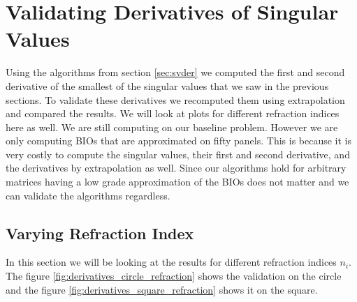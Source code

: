 \documentclass[a4paper, oneside]{thirdparty_stylesheets/discothesis}
\begin{document}
\section{Validating Derivatives of Singular Values}
Using the algorithms from section \ref{sec:svder} we computed the first and second derivative of the smallest of the singular values that we saw in the previous sections.
To validate these derivatives we recomputed them using extrapolation and compared the results.
We will look at plots for different refraction indices here as well.
We are still computing on our baseline problem.
However we are only computing BIOs that are approximated on fifty panels.
This is because it is very costly to compute the singular values, their first and second derivative, and the derivatives by extrapolation as well.
Since our algorithms hold for arbitrary matrices having a low grade approximation of the BIOs does not matter and we can validate the algorithms regardless.
\subsection{Varying Refraction Index}
In this section we will be looking at the results for different refraction indices $n_i$.
The figure \ref{fig:derivatives_circle_refraction} shows the validation on the circle and the figure \ref{fig:derivatives_square_refraction} shows it on the square.
\end{document}
